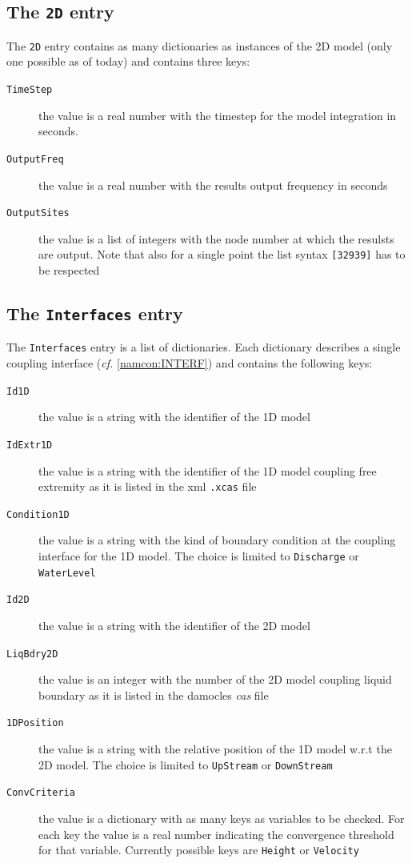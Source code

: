 \documentclass[Coupling]{../../data/TelemacDoc} %
\begin{document}
\subsection{The \texttt{2D} entry}
The \texttt{2D} entry contains as many dictionaries as instances of the 2D
model (only one possible as of today) and contains three keys: 
\begin{description}
  \item[\texttt{TimeStep}] the value is a real number with the
    timestep for the model integration in seconds.
  \item[\texttt{OutputFreq}] the value is a real number with the
    results output frequency in seconds
  \item[\texttt{OutputSites}] the value is a list of integers with the
    node number at which the resulsts are output. Note that also for a
    single point the list syntax \texttt{[32939]} has to be respected
\end{description}

\subsection{The \texttt{Interfaces} entry}
The \texttt{Interfaces} entry is a list of dictionaries.  
Each dictionary describes a single coupling interface ({\em cf.}
\ref{namcon:INTERF}) and contains the following keys:
\begin{description}
  \item[\texttt{Id1D}] the value is a string with the identifier of
    the 1D model
  \item[\texttt{IdExtr1D}] the value is a string with the identifier of
    the 1D model coupling free extremity as it is listed in the xml
    \texttt{.xcas} file
  \item[\texttt{Condition1D}] the value is a string with the kind of
    boundary condition at the coupling interface for the 1D model. The
    choice is limited to \texttt{Discharge} or \texttt{WaterLevel}
  \item[\texttt{Id2D}] the value is a string with the identifier of
    the 2D model
  \item[\texttt{LiqBdry2D}] the value is an integer with the number of
    the 2D model coupling liquid boundary as it is listed in the damocles
    {\em cas} file
  \item[\texttt{1DPosition}] the value is a string with the relative
    position of the 1D model w.r.t the 2D model. The
    choice is limited to \texttt{UpStream} or \texttt{DownStream}
  \item[\texttt{ConvCriteria}] the value is a dictionary with as many
    keys as variables to be checked. For each key the value is a real
    number indicating the convergence threshold for that
    variable. Currently possible keys are \texttt{Height} or \texttt{Velocity}
\end{description}
\end{document}
